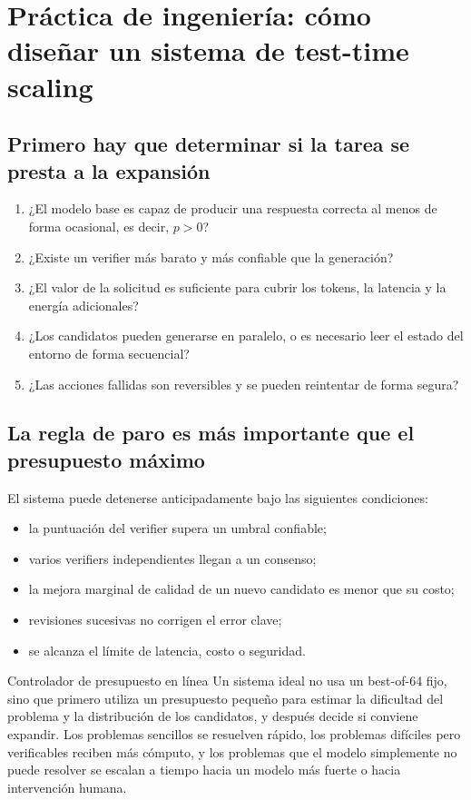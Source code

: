 \section{Práctica de ingeniería: cómo diseñar un sistema de test-time scaling}

\subsection{Primero hay que determinar si la tarea se presta a la expansión}

\begin{enumerate}
    \item ¿El modelo base es capaz de producir una respuesta correcta al menos de forma ocasional, es decir, $p>0$?
    \item ¿Existe un verifier más barato y más confiable que la generación?
    \item ¿El valor de la solicitud es suficiente para cubrir los tokens, la latencia y la energía adicionales?
    \item ¿Los candidatos pueden generarse en paralelo, o es necesario leer el estado del entorno de forma secuencial?
    \item ¿Las acciones fallidas son reversibles y se pueden reintentar de forma segura?
\end{enumerate}

\subsection{La regla de paro es más importante que el presupuesto máximo}

El sistema puede detenerse anticipadamente bajo las siguientes condiciones:

\begin{itemize}
    \item la puntuación del verifier supera un umbral confiable;
    \item varios verifiers independientes llegan a un consenso;
    \item la mejora marginal de calidad de un nuevo candidato es menor que su costo;
    \item revisiones sucesivas no corrigen el error clave;
    \item se alcanza el límite de latencia, costo o seguridad.
\end{itemize}

\begin{importantbox}{Controlador de presupuesto en línea}
Un sistema ideal no usa un best-of-64 fijo, sino que primero utiliza un presupuesto pequeño para estimar la dificultad del problema y la distribución de los candidatos, y después decide si conviene expandir. Los problemas sencillos se resuelven rápido, los problemas difíciles pero verificables reciben más cómputo, y los problemas que el modelo simplemente no puede resolver se escalan a tiempo hacia un modelo más fuerte o hacia intervención humana.
\end{importantbox}

